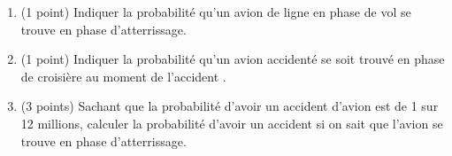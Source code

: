\documentclass[a4paper]{article}
\newif\ifcorrection
\begin{document}
\begin{enumerate}
 \item (1 point) Indiquer la probabilit\'e qu'un avion de ligne en phase de vol se trouve en phase d'atterrissage. %
 \ifcorrection
  \textcolor{red}{On note pour la suite: $T=\{\text{phase d'aTterrissage}\}$ \\
  Selon la Fig.1 on a: $P(T) = 4\% = 0,04$ }
 \fi
 \item (1 point) Indiquer la probabilit\'e qu'un avion accident\'e se soit trouv\'e en phase de croisi\`ere au moment de l'accident . %
  \ifcorrection
  \textcolor{red}{ On note $A=\{\text{L'avion a un Accident}\}$ et $C=\{\text{vol de Croisiere}\}$\\
  Selon la Fig.1 on a: $P(C|A) = 5\% = 0,05$  } %
 \fi
 \item (3 points) Sachant que la probabilit\'e d'avoir un accident d'avion est de 1 sur 12 millions, calculer la probabilit\'e
 d'avoir un accident si on sait que l'avion se trouve en phase d'atterrissage.
 \ifcorrection
  \textcolor{red}{~\\D'apr\`es le theoreme de Bayes, on a:\\
   $P(A|T) = \frac{P(T|A) P(A)}{P(T)} $.\\
  L'\'enonc\'e nous donne $P(A)= \frac{1}{12 \times 10^6}$, $P(T|A) = 0,51$ qui conduit \`a:\\
  $P(A|T) = \frac{0,51 \frac{1}{12 \times 10^6}}{0,04} \approx 1,0625\times 10^{-6}$ 
 }
 \fi
  \ifcorrection
   \textcolor{red}{
  Le facteur multiplicatif d'avoir un accident d'avion quand un avion est en phase d'atterrissage vaut:
   $a_T = \frac{P(A|T)}{P(A)} = \frac{P(T|A)}{P(T)} = \frac{0,51}{0,04} \approx 12,75$.\\
   Pour la phase de d\'ecollage: (on note $D=\{Decollage \}$)\\
  on a $P(A|D) = \frac{P(D|A) P(A)}{P(D)} = \frac{0,2 \frac{1}{12 \times 10^6}}{0,02}$\\
   et donc le facteur multiplicatif d'avoir un accident en phase de d\'ecollage vaut :\\
   $a_D = \frac{P(A|D)}{P(A)} = \frac{P(D|A)}{P(D)} = \frac{0,2}{0,02} = 10$
  }
  \fi
\end{enumerate}
\end{document}
